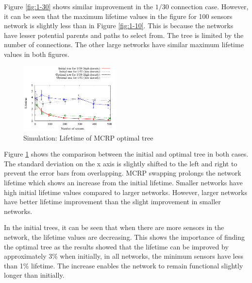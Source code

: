 Figure \ref{fig:1-30} shows similar improvement in the $1/30$ connection case. However, it can be seen that the maximum lifetime values in the figure for 100 sensors network is slightly less than in Figure \ref{fig:1-10}. This is because the networks have lesser potential parents and paths to select from. The tree is limited by the number of connections. The other large networks have similar maximum lifetime values in both figures.

\begin{figure}
\centering
\includegraphics[width=0.45\textwidth]{figures/maxmin.pdf}
\caption{Simulation: Lifetime of MCRP optimal tree}
\label{fig:nodes-maxmin}
\end{figure}

Figure \ref{fig:nodes-maxmin} shows the comparison between the initial and optimal tree in both cases. The standard deviation on the x axis is slightly shifted to the left and right to prevent the error bars from overlapping. MCRP swapping prolongs the network lifetime which shows an increase from the initial lifetime. Smaller networks have high initial lifetime values compared to larger networks. However, larger networks have better lifetime improvement than the slight improvement in smaller networks.

In the initial trees, it can be seen that when there are more sensors in the network, the lifetime values are decreasing. This shows the importance of finding the optimal tree as the results showed that the lifetime can be improved by approximately 3\% when initially, in all networks, the minimum sensors have less than 1\% lifetime. The increase enables the network to remain functional slightly longer than initially. 